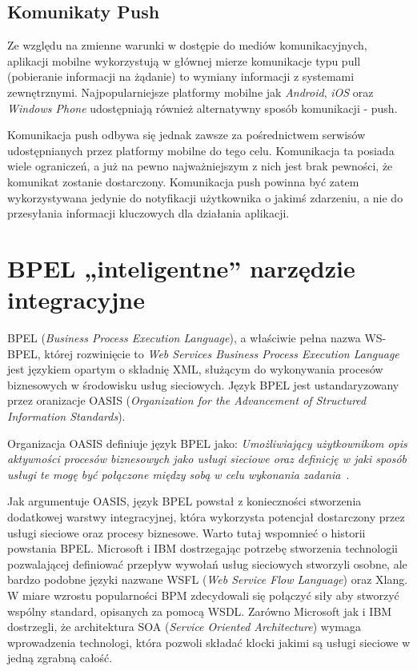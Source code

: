 \subsection{Komunikaty Push}
\label{sec:push}

Ze względu na zmienne warunki w dostępie do mediów komunikacyjnych, aplikacji mobilne wykorzystują w głównej mierze komunikacje typu pull (pobieranie informacji na żądanie) to wymiany informacji z systemami zewnętrznymi. Najpopularniejsze platformy mobilne jak \textit{Android}, \textit{iOS} oraz \textit{Windows Phone} udostępniają również alternatywny sposób komunikacji - push. 

Komunikacja push odbywa się jednak zawsze za pośrednictwem serwisów udostępnianych przez platformy mobilne do tego celu. Komunikacja ta posiada wiele ograniczeń, a już na pewno najważniejszym z nich jest brak pewności, że komunikat zostanie dostarczony. Komunikacja push powinna być zatem wykorzystywana jedynie do notyfikacji użytkownika o jakimś zdarzeniu, a nie do przesyłania informacji kluczowych dla działania aplikacji. 


\section{BPEL „inteligentne” narzędzie integracyjne}
\label{sec:bpel}

BPEL (\textit{Business Process Execution Language}), a właściwie pełna nazwa WS-BPEL,  której rozwinięcie to \textit{Web Services Business Process Execution Language} jest językiem opartym o składnię XML, służącym do wykonywania procesów biznesowych w środowisku usług sieciowych. Język BPEL jest ustandaryzowany przez oranizacje OASIS (\textit{Organization for the Advancement of Structured Information Standards}). 

Organizacja OASIS definiuje język BPEL jako: \textit{Umożliwiający użytkownikom opis aktywności procesów biznesowych jako usługi sieciowe oraz definicję w jaki sposób usługi te mogę być połączone między sobą w celu wykonania zadania}~\cite{OASISweb}.

Jak argumentuje OASIS, język BPEL powstał z konieczności stworzenia dodatkowej warstwy integracyjnej, która wykorzysta potencjał dostarczony przez usługi sieciowe oraz procesy biznesowe. Warto tutaj wspomnieć o historii powstania BPEL. Microsoft i IBM dostrzegając potrzebę stworzenia technologii pozwalającej definiować przepływ wywołań usług sieciowych stworzyli osobne, ale bardzo podobne języki nazwane WSFL (\textit{Web Service Flow Language}) oraz Xlang. W miare wzrostu popularności BPM zdecydowali się połączyć siły aby stworzyć wspólny standard, opisanych za pomocą WSDL. Zarówno Microsoft jak i IBM dostrzegli, że architektura SOA (\textit{Service Oriented Architecture}) wymaga wprowadzenia technologi, która pozwoli składać klocki jakimi są usługi sieciowe w jedną zgrabną całość.


